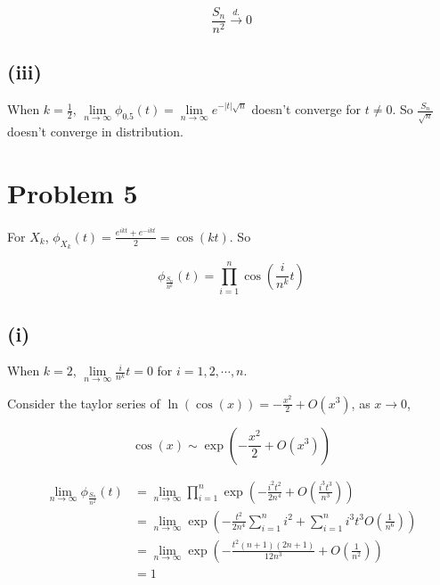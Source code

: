 \documentclass{article}
\begin{document}
\begin{equation}
    \frac{S_n}{n^2} \overset{d.}{\to} 0
\end{equation}

\subsection{(iii)}

When $k=\frac{1}{2}$, $\lim\limits_{n\to \infty} \phi_{0.5}(t) = \lim\limits_{n\to \infty} e^{-|t|\sqrt{n}}$ doesn't converge for $t\neq 0$. So $\frac{S_n}{\sqrt{n}}$ doesn't converge in distribution.

\section{Problem 5}

For $X_k$, $\phi_{X_k}(t) = \frac{e^{ikt} + e^{-ikt}}{2} = \cos (kt)$. So

\begin{equation}
    \phi_{\frac{S_n}{n^k}} (t) = \prod_{i=1}^n \cos(\frac{i}{n^k}t) 
\end{equation}

\subsection{(i)}

When $k=2$, $\lim\limits_{n\to \infty}\frac{i}{n^k}t = 0$ for $i=1,2,\cdots,n$.

Consider the taylor series of $\ln(\cos(x))= -\frac{x^2}{2}+ O(x^3)$, as $x\to 0$,

\begin{equation}
    \cos(x) \sim \exp \left({-\frac{x^2}{2} + O(x^3)}\right)
\end{equation}

\begin{equation}
    \begin{aligned}
        \lim_{n\to \infty}\phi_{\frac{S_n}{n^2}} (t) & =  \lim_{n\to \infty}\prod_{i=1}^n \exp \left({-\frac{i^2t^2}{2n^4} + O(\frac{i^3t^3}{n^3})}\right) \\
        & = \lim_{n\to \infty} \exp \left({-\frac{t^2}{2n^4}\sum_{i=1}^n i^2 + \sum_{i=1}^n i^3t^3 O(\frac{1}{n^6})}\right) \\
        & = \lim_{n\to \infty} \exp \left({-\frac{t^2(n+1)(2n+1)}{12n^3} +  O(\frac{1}{n^2})}\right) \\
        & = 1
    \end{aligned}
\end{equation}
\end{document}
